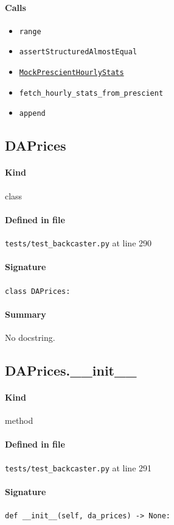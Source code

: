 \documentclass[11pt]{report}
\begin{document}
\paragraph{Calls}
\begin{itemize}[leftmargin=*]
  \item \texttt{range}
  \item \texttt{assertStructuredAlmostEqual}
  \item \hyperref[def:tests-test_backcaster.py:MockPrescientHourlyStats:L231]{\texttt{MockPrescientHourlyStats}}
  \item \texttt{fetch\_hourly\_stats\_from\_prescient}
  \item \texttt{append}
\end{itemize}
\subsection{DAPrices}
\label{def:tests-test_backcaster.py:DAPrices:L290}
\paragraph{Kind} class
\paragraph{Defined in file} \texttt{tests/test\_backcaster.py} at line 290
\paragraph{Signature} \texttt{class DAPrices:}
\paragraph{Summary} No docstring.
\subsection{DAPrices.\_\_init\_\_}
\label{def:tests-test_backcaster.py:DAPrices.__init__:L291}
\paragraph{Kind} method
\paragraph{Defined in file} \texttt{tests/test\_backcaster.py} at line 291
\paragraph{Signature} \texttt{def \_\_init\_\_(self, da\_prices) -> None:}
\end{document}
